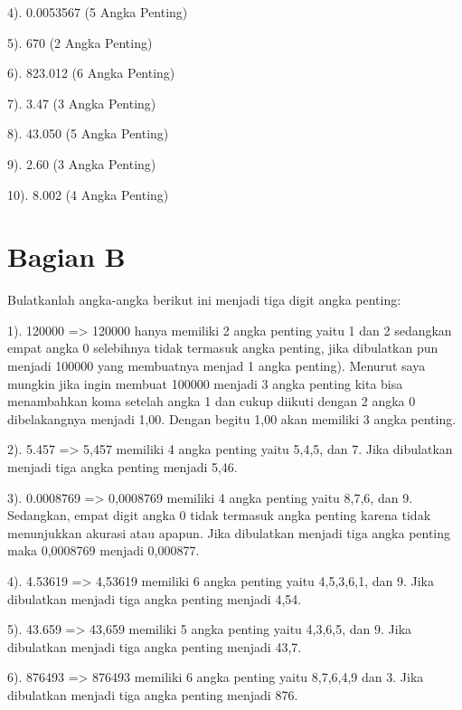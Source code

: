 \documentclass{article}
\begin{document}
4). 0.0053567 (5 Angka Penting)

5). 670 (2 Angka Penting)

6). 823.012 (6 Angka Penting)

7). 3.47 (3 Angka Penting)

8). 43.050 (5 Angka Penting)

9). 2.60 (3 Angka Penting)

10). 8.002 (4 Angka Penting)

\section*{Bagian B}
Bulatkanlah angka-angka berikut ini menjadi tiga digit angka penting:

1). 120000
=> 120000 hanya memiliki 2 angka penting yaitu 1 dan 2 sedangkan empat angka 0 selebihnya tidak termasuk angka penting, jika dibulatkan pun menjadi 100000 yang membuatnya menjad 1 angka penting).
Menurut saya mungkin jika ingin membuat 100000 menjadi 3 angka penting kita bisa menambahkan koma setelah angka 1 dan cukup diikuti dengan 2 angka 0 dibelakangnya menjadi 1,00. Dengan begitu 1,00 akan memiliki 3 angka penting.

2). 5.457
=> 5,457 memiliki 4 angka penting yaitu 5,4,5, dan 7. Jika dibulatkan menjadi tiga angka penting menjadi 5,46.

3). 0.0008769
=> 0,0008769 memiliki 4 angka penting yaitu 8,7,6, dan 9. Sedangkan, empat digit angka 0 tidak termasuk angka penting karena tidak menunjukkan akurasi atau apapun. Jika dibulatkan menjadi tiga angka penting maka 0,0008769 menjadi 0,000877.

4). 4.53619
=> 4,53619 memiliki 6 angka penting yaitu 4,5,3,6,1, dan 9. Jika dibulatkan menjadi tiga angka penting menjadi 4,54.

5). 43.659
=> 43,659 memiliki 5 angka penting yaitu 4,3,6,5, dan 9. Jika dibulatkan menjadi tiga angka penting menjadi 43,7.

6). 876493
=> 876493 memiliki 6 angka penting yaitu 8,7,6,4,9 dan 3. Jika dibulatkan menjadi tiga angka penting menjadi 876.
\end{document}
